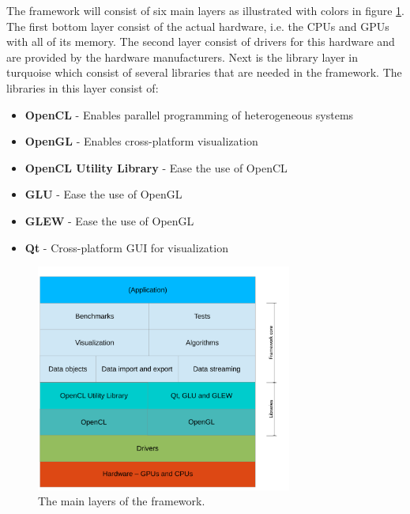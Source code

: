 \documentclass{article}
\begin{document}
The framework will consist of six main layers as illustrated with colors in figure \ref{fig:diagram}.
The first bottom layer consist of the actual hardware, i.e. the CPUs and GPUs with all of its memory.
The second layer consist of drivers for this hardware and are provided by the hardware manufacturers.
Next is the library layer in turquoise which consist of several libraries that are needed in the framework.
The libraries in this layer consist of:
\begin{itemize}
    \itemsep 1pt
    \item \textbf{OpenCL} - Enables parallel programming of heterogeneous systems
    \item \textbf{OpenGL} - Enables cross-platform visualization
    \item \textbf{OpenCL Utility Library} - Ease the use of OpenCL
    \item \textbf{GLU} - Ease the use of OpenGL
    \item \textbf{GLEW} - Ease the use of OpenGL
    \item \textbf{Qt} - Cross-platform GUI for visualization
\end{itemize}

\begin{figure}[h]
    \centering
    \includegraphics[width=0.75\textwidth]{framework_diagram.pdf}
    \caption{The main layers of the framework.}
    \label{fig:diagram}
\end{figure}
\end{document}
